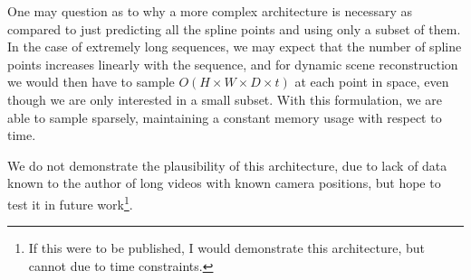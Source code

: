One may question as to why a more complex architecture is necessary as compared to just predicting all the spline points and using only a subset of them. In the case of extremely long sequences, we may expect that the number of spline points increases linearly with the sequence, and for dynamic scene reconstruction we would then have to sample $O(H\times W\times D\times t)$ at each point in space, even though we are only interested in a small subset. With this formulation, we are able to sample sparsely, maintaining a constant memory usage with respect to time.

We do not demonstrate the plausibility of this architecture, due to lack of data known to the
author of long videos with known camera positions, but hope to test it in future work\footnote{If this were to be published, I would demonstrate this architecture, but cannot due to time constraints.}.
